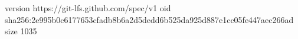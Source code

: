version https://git-lfs.github.com/spec/v1
oid sha256:2e995b0c6177653cfadb8b6a2d5dedd6b525da925d887e1cc05fe447aec266ad
size 1035
